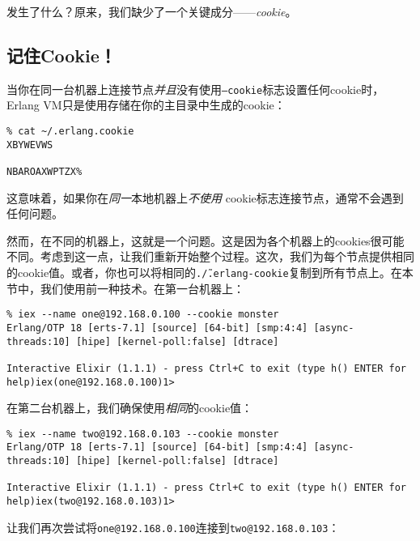 发生了什么？原来，我们缺少了一个关键成分------\emph{cookie}。

\subsection{记住Cookie！}

当你在同一台机器上连接节点\emph{并且}没有使用\texttt{--cookie}标志设置任何cookie时，Erlang
VM只是使用存储在你的主目录中生成的cookie：

\begin{code}{}
\begin{verbatim}
% cat ~/.erlang.cookie
XBYWEVWS

NBAROAXWPTZX%
\end{verbatim}
\end{code}

这意味着，如果你在\emph{同一}本地机器上\emph{不使用}
cookie标志连接节点，通常不会遇到任何问题。

然而，在不同的机器上，这就是一个问题。这是因为各个机器上的cookies很可能不同。考虑到这一点，让我们重新开始整个过程。这次，我们为每个节点提供相同的cookie值。或者，你也可以将相同的\texttt{.\~/.erlang-cookie}复制到所有节点上。在本节中，我们使用前一种技术。在第一台机器上：

\begin{code}{}
\begin{verbatim}
% iex --name one@192.168.0.100 --cookie monster
Erlang/OTP 18 [erts-7.1] [source] [64-bit] [smp:4:4] [async-threads:10] [hipe] [kernel-poll:false] [dtrace]

Interactive Elixir (1.1.1) - press Ctrl+C to exit (type h() ENTER for help)iex(one@192.168.0.100)1>
\end{verbatim}
\end{code}

在第二台机器上，我们确保使用\emph{相同}的cookie值：

\begin{code}{}
\begin{verbatim}
% iex --name two@192.168.0.103 --cookie monster
Erlang/OTP 18 [erts-7.1] [source] [64-bit] [smp:4:4] [async-threads:10] [hipe] [kernel-poll:false] [dtrace]

Interactive Elixir (1.1.1) - press Ctrl+C to exit (type h() ENTER for help)iex(two@192.168.0.103)1>
\end{verbatim}
\end{code}

让我们再次尝试将\texttt{one@192.168.0.100}连接到\texttt{two@192.168.0.103}：

